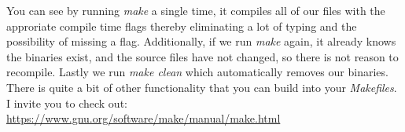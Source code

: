 \documentclass[../main.tex]{subfiles}
\begin{document}
You can see by running \textit{make} a single time, it compiles all of our files with the approriate compile time flags thereby eliminating a lot of typing and the possibility of missing a flag.  Additionally, if we run \textit{make} again, it already knows the binaries exist, and the source files have not changed, so there is not reason to recompile.  Lastly we run \textit{make clean} which automatically removes our binaries.  There is quite a bit of other functionality that you can build into your \textit{Makefiles}.  I invite you to check out: \href{https://www.gnu.org/software/make/manual/make.html}{https://www.gnu.org/software/make/manual/make.html}
\end{document}

